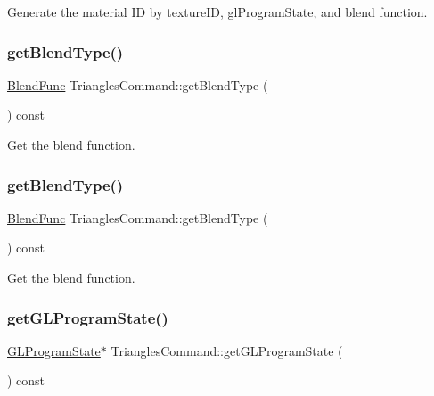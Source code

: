Generate the material ID by texture\+ID, gl\+Program\+State, and blend function. \mbox{\label{classTrianglesCommand_ad86f807326f056256e20ceba83a0a3d1}} 
\subsubsection{\texorpdfstring{get\+Blend\+Type()}{getBlendType()}\hspace{0.1cm}{\footnotesize\ttfamily [1/2]}}
{\footnotesize\ttfamily \hyperlink{structBlendFunc}{Blend\+Func} Triangles\+Command\+::get\+Blend\+Type (\begin{DoxyParamCaption}{ }\end{DoxyParamCaption}) const\hspace{0.3cm}{\ttfamily [inline]}}

Get the blend function. \mbox{\label{classTrianglesCommand_ad86f807326f056256e20ceba83a0a3d1}} 
\subsubsection{\texorpdfstring{get\+Blend\+Type()}{getBlendType()}\hspace{0.1cm}{\footnotesize\ttfamily [2/2]}}
{\footnotesize\ttfamily \hyperlink{structBlendFunc}{Blend\+Func} Triangles\+Command\+::get\+Blend\+Type (\begin{DoxyParamCaption}{ }\end{DoxyParamCaption}) const\hspace{0.3cm}{\ttfamily [inline]}}

Get the blend function. \mbox{\label{classTrianglesCommand_a1cf973a55b277ae0a81f3d10db1c0745}} 
\subsubsection{\texorpdfstring{get\+G\+L\+Program\+State()}{getGLProgramState()}\hspace{0.1cm}{\footnotesize\ttfamily [1/2]}}
{\footnotesize\ttfamily \hyperlink{classGLProgramState}{G\+L\+Program\+State}$\ast$ Triangles\+Command\+::get\+G\+L\+Program\+State (\begin{DoxyParamCaption}{ }\end{DoxyParamCaption}) const\hspace{0.3cm}{\ttfamily [inline]}}

